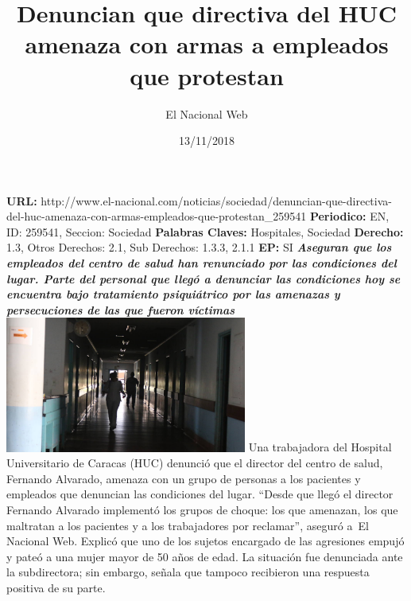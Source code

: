 \documentclass{article}%
\title{\textbf{Denuncian que directiva del HUC amenaza con armas a empleados que protestan}}%
\author{El Nacional Web}%
\date{13/11/2018}%
\begin{document}
%
\normalsize%
\maketitle%
\textbf{URL: }%
http://www.el{-}nacional.com/noticias/sociedad/denuncian{-}que{-}directiva{-}del{-}huc{-}amenaza{-}con{-}armas{-}empleados{-}que{-}protestan\_259541\newline%
%
\textbf{Periodico: }%
EN, %
ID: %
259541, %
Seccion: %
Sociedad\newline%
%
\textbf{Palabras Claves: }%
Hospitales, Sociedad\newline%
%
\textbf{Derecho: }%
1.3, %
Otros Derechos: %
2.1, %
Sub Derechos: %
1.3.3, 2.1.1\newline%
%
\textbf{EP: }%
SI\newline%
\newline%
%
\textbf{\textit{Aseguran que los empleados del centro de salud han renunciado por las condiciones del lugar. Parte del personal que llegó a denunciar las condiciones hoy se encuentra bajo tratamiento psiquiátrico por las amenazas y persecuciones de las que fueron víctimas}}%
\newline%
\newline%
%
\includegraphics[width=300px]{135.jpg}%
\newline%
%
Una trabajadora del Hospital Universitario de Caracas (HUC) denunció que el director del centro de salud, Fernando Alvarado, amenaza con un grupo de personas a los pacientes y empleados que denuncian las condiciones del lugar.%
\newline%
%
“Desde que llegó el director Fernando Alvarado implementó los grupos de choque: los que amenazan, los que maltratan a los pacientes y a los trabajadores por reclamar”, aseguró a~El Nacional Web.%
\newline%
%
Explicó que uno de los sujetos encargado de las agresiones empujó y pateó a una mujer mayor de 50 años de edad. La situación fue denunciada ante la subdirectora; sin embargo, señala que tampoco recibieron una respuesta positiva de su parte.%
\newline%
\end{document}
